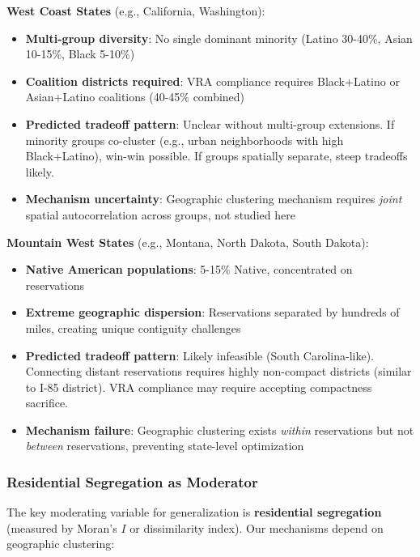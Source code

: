 \textbf{West Coast States} (e.g., California, Washington):
\begin{itemize}
    \item \textbf{Multi-group diversity}: No single dominant minority (Latino 30-40\%, Asian 10-15\%, Black 5-10\%)
    \item \textbf{Coalition districts required}: VRA compliance requires Black+Latino or Asian+Latino coalitions (40-45\% combined)
    \item \textbf{Predicted tradeoff pattern}: Unclear without multi-group extensions. If minority groups co-cluster (e.g., urban neighborhoods with high Black+Latino), win-win possible. If groups spatially separate, steep tradeoffs likely.
    \item \textbf{Mechanism uncertainty}: Geographic clustering mechanism requires \emph{joint} spatial autocorrelation across groups, not studied here
\end{itemize}

\textbf{Mountain West States} (e.g., Montana, North Dakota, South Dakota):
\begin{itemize}
    \item \textbf{Native American populations}: 5-15\% Native, concentrated on reservations
    \item \textbf{Extreme geographic dispersion}: Reservations separated by hundreds of miles, creating unique contiguity challenges
    \item \textbf{Predicted tradeoff pattern}: Likely infeasible (South Carolina-like). Connecting distant reservations requires highly non-compact districts (similar to I-85 district). VRA compliance may require accepting compactness sacrifice.
    \item \textbf{Mechanism failure}: Geographic clustering exists \emph{within} reservations but not \emph{between} reservations, preventing state-level optimization
\end{itemize}

\subsubsection{Residential Segregation as Moderator}

The key moderating variable for generalization is \textbf{residential segregation} (measured by Moran's $I$ or dissimilarity index). Our mechanisms depend on geographic clustering:


